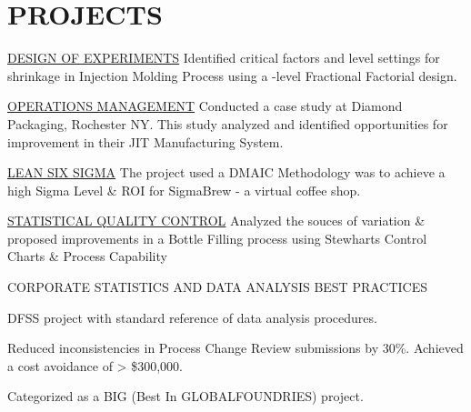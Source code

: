 \documentclass[]{bigfatnoob-resume}
\begin{document}
\begin{minipage}[t]{0.66\textwidth}
		\section{PROJECTS}
		\location{}
		\begin{tightemize}
			\item \href{http://sandeepmohan.com/files/DOE_Simulation.pdf}{\ibf DESIGN OF EXPERIMENTS} Identified critical factors and level settings for shrinkage in Injection Molding Process using a {-level Fractional Factorial design}. 
			\item \href{http://sandeepmohan.com/files/JIT_At_Diamond_Packaging.pdf}{\ibf OPERATIONS MANAGEMENT} Conducted a case study at Diamond Packaging, Rochester NY. This study analyzed and identified opportunities for improvement in their {\ibf JIT} Manufacturing System.
			\item \href{http://sandeepmohan.com/files/SigmaBrew_DMAIC.pdf}{\ibf LEAN SIX SIGMA} The project used a {\ibf DMAIC} Methodology was to achieve a high {\ibf Sigma Level} \& {\ibf ROI} for SigmaBrew - a virtual coffee shop.
			\item \href{http://sandeepmohan.com/files/SQC_Bottle_filling.pdf}{\ibf STATISTICAL QUALITY CONTROL} Analyzed the souces of variation \& proposed improvements in a Bottle Filling process using {\ibf Stewharts Control Charts} \& {\ibf Process Capability}
		\end{tightemize}
		\sectionsep
		
		\runsubsection{Industrial}
		\location{}
		\begin{tightemize}
			\item {\ibf CORPORATE STATISTICS AND DATA ANALYSIS BEST PRACTICES}
			\begin{tightemize}
				\vspace{\topsep}
				\item {\ibf DFSS} project with standard reference of data analysis procedures.
				\item  Reduced inconsistencies in Process Change Review submissions by 30\%. Achieved a cost avoidance of > \$300,000.
				\item Categorized as a {\ibf BIG (Best In GLOBALFOUNDRIES)} project.
			\end{tightemize}
		\end{tightemize}
		\sectionsep
		
		

\end{minipage}
\end{document}
